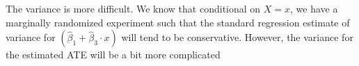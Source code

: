 \documentclass{article}
\begin{document}
The variance is more difficult. We know that conditional on $X=x$, we have a marginally randomized experiment such that the standard regression estimate of variance for $(\hat{\beta}_1 + \hat{\beta}_3 \cdot x)$ will tend to be conservative. However, the variance for the estimated ATE will be a bit more complicated
\begin{align*}


\end{align*}





\end{document}
